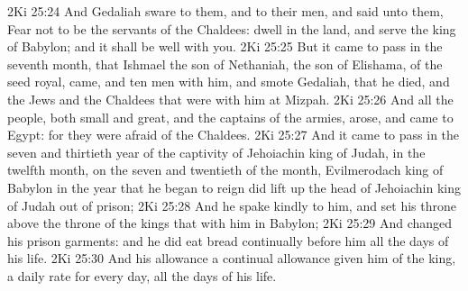 \vs 2Ki 25:24 And Gedaliah sware to them, and to their men, and said unto them, Fear not to be the servants of the Chaldees: dwell in the land, and serve the king of Babylon; and it shall be well with you.
\vs 2Ki 25:25 But it came to pass in the seventh month, that Ishmael the son of Nethaniah, the son of Elishama, of the seed royal, came, and ten men with him, and smote Gedaliah, that he died, and the Jews and the Chaldees that were with him at Mizpah.
\vs 2Ki 25:26 And all the people, both small and great, and the captains of the armies, arose, and came to Egypt: for they were afraid of the Chaldees.
\vs 2Ki 25:27 And it came to pass in the seven and thirtieth year of the captivity of Jehoiachin king of Judah, in the twelfth month, on the seven and twentieth  of the month,  Evilmerodach king of Babylon in the year that he began to reign did lift up the head of Jehoiachin king of Judah out of prison;
\vs 2Ki 25:28 And he spake kindly to him, and set his throne above the throne of the kings that  with him in Babylon;
\vs 2Ki 25:29 And changed his prison garments: and he did eat bread continually before him all the days of his life.
\vs 2Ki 25:30 And his allowance  a continual allowance given him of the king, a daily rate for every day, all the days of his life.
